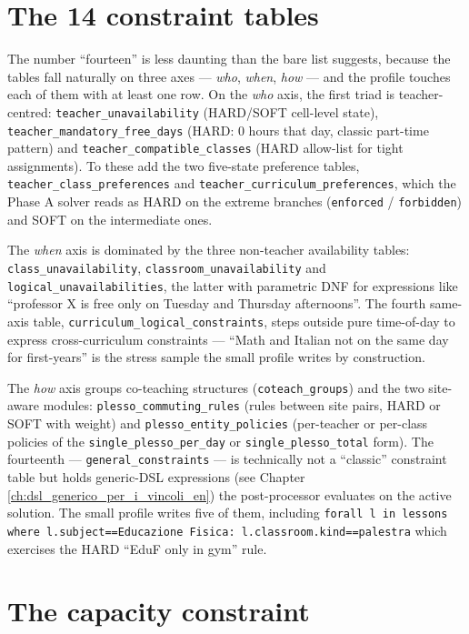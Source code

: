 \section{The 14 constraint tables}

The number ``fourteen'' is less daunting than the bare list
suggests, because the tables fall naturally on three axes ---
\emph{who}, \emph{when}, \emph{how} --- and the profile touches
each of them with at least one row. On the \emph{who} axis, the
first triad is teacher-centred: \texttt{teacher\_unavailability}
(HARD/SOFT cell-level state), \texttt{teacher\_mandatory\_free\_days}
(HARD: 0 hours that day, classic part-time pattern) and
\texttt{teacher\_compatible\_classes} (HARD allow-list for tight
assignments). To these add the two five-state preference tables,
\texttt{teacher\_class\_preferences} and
\texttt{teacher\_curriculum\_preferences}, which the Phase A
solver reads as HARD on the extreme branches
(\texttt{enforced} / \texttt{forbidden}) and SOFT on the
intermediate ones.

The \emph{when} axis is dominated by the three non-teacher
availability tables: \texttt{class\_unavailability},
\texttt{classroom\_unavailability} and
\texttt{logical\_unavailabilities}, the latter with parametric
DNF for expressions like ``professor X is free only on Tuesday
and Thursday afternoons''. The fourth same-axis table,
\texttt{curriculum\_logical\_constraints}, steps outside pure
time-of-day to express cross-curriculum constraints --- ``Math
and Italian not on the same day for first-years'' is the stress
sample the small profile writes by construction.

The \emph{how} axis groups co-teaching structures
(\texttt{coteach\_groups}) and the two site-aware modules:
\texttt{plesso\_commuting\_rules} (rules between site pairs,
HARD or SOFT with weight) and \texttt{plesso\_entity\_policies}
(per-teacher or per-class policies of the
\texttt{single\_plesso\_per\_day} or \texttt{single\_plesso\_total}
form). The fourteenth --- \texttt{general\_constraints} --- is
technically not a ``classic'' constraint table but holds
generic-DSL expressions (see Chapter
\ref{ch:dsl_generico_per_i_vincoli_en}) the post-processor evaluates
on the active solution. The small profile writes five of them,
including \texttt{forall l in lessons where
l.subject==Educazione Fisica: l.classroom.kind==palestra} which
exercises the HARD ``EduF only in gym'' rule.

\section{The capacity constraint}

